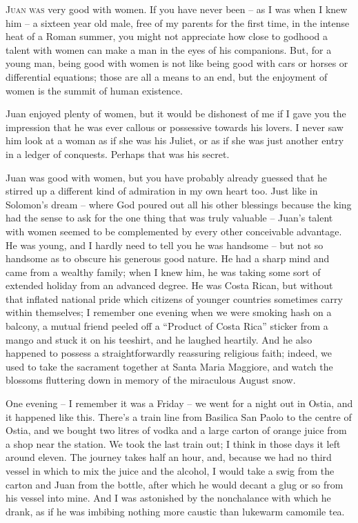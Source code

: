 \noindent \textsc{Juan was} very good with women. If you have never been -- as I was when I knew him -- a sixteen year old male, free of my parents for the first time, in the intense heat of a Roman summer, you might not appreciate how close to godhood a talent with women can make a man in the eyes of his companions. But, for a young man, being good with women is not like being good with cars or horses or differential equations; those are all a means to an end, but the enjoyment of women is the summit of human existence.

Juan enjoyed plenty of women, but it would be dishonest of me if I gave you the impression that he was ever callous or possessive towards his lovers. I never saw him look at a woman as if she was his Juliet, or as if she was just another entry in a ledger of conquests. Perhaps that was his secret.

Juan was good with women, but you have probably already guessed that he stirred up a different kind of admiration in my own heart too. Just like in Solomon's dream -- where God poured out all his other blessings because the king had the sense to ask for the one thing that was truly valuable -- Juan's talent with women seemed to be complemented by every other conceivable advantage. He was young, and I hardly need to tell you he was handsome -- but not so handsome as to obscure his generous good nature. He had a sharp mind and came from a wealthy family; when I knew him, he was taking some sort of extended holiday from an advanced degree. He was Costa Rican, but without that inflated national pride which citizens of younger countries sometimes carry within themselves; I remember one evening when we were smoking hash on a balcony, a mutual friend peeled off a ``Product of Costa Rica'' sticker from a mango and stuck it on his teeshirt, and he laughed heartily. And he also happened to possess a straightforwardly reassuring religious faith; indeed, we used to take the sacrament together at Santa Maria Maggiore, and watch the blossoms fluttering down in memory of the miraculous August snow.

\prosesep

One evening -- I remember it was a Friday -- we went for a night out in Ostia, and it happened like this. There's a train line from Basilica San Paolo to the centre of Ostia, and we bought two litres of vodka and a large carton of orange juice from a shop near the station. We took the last train out; I think in those days it left around eleven. The journey takes half an hour, and, because we had no third vessel in which to mix the juice and the alcohol, I would take a swig from the carton and Juan from the bottle, after which he would decant a glug or so from his vessel into mine. And I was astonished by the nonchalance with which he drank, as if he was imbibing nothing more caustic than lukewarm camomile tea.

